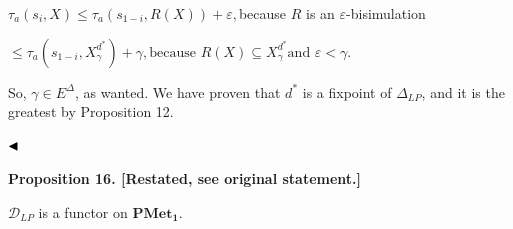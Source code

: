 \par  \quad  $\displaystyle\tau_{a}(s_{i},X)$\quad  $\displaystyle\leq\tau_{a}(s_{1-i},R(X))+\varepsilon,$\quad  because $R$ is an $\varepsilon$-bisimulation\quad  \quad  
 
\par  \quad  \quad  $\displaystyle\leq\tau_{a}(s_{1-i},X^{d^{*}}_{\gamma})+\gamma,$\quad  $\displaystyle\mbox{because }R(X)\subseteq X^{d^{*}}_{\gamma}\mbox{and }\varepsilon<\gamma.$\quad  \quad  
  
So, $\gamma\in E^{\Delta}$, as wanted. We have proven that $d^{*}$ is a fixpoint of $\Delta_{LP}$, and it is the greatest by Proposition 12.\par
 
   
$\hfill\blacktriangleleft$\par
 
 
 
 
\par\medskip\noindent\textbf{Proposition 16. [Restated, see original statement.]}\par
 
 
$\mathcal{D}_{LP}$ is a functor on $\mathbf{PMet_{1}}$.\par
 
 
 
 
